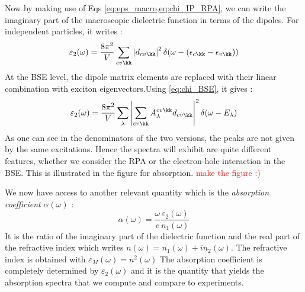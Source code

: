 Now by making use of Eqs \eqref{eq:eps_macro,eq:chi_IP_RPA}, we can write the imaginary part of the macroscopic dielectric function in terms of the dipoles. For independent particles, it writes :
\begin{equation}
	\varepsilon_2(\omega) = \frac{8\pi^2}{V} \sum_{cv\kk} \left| d_{cv\kk} \right|^2 \delta(\omega - (\epsilon_{c\kk} - \epsilon_{v\kk}) ) \label{eq:eps_2_IP}
\end{equation}
At the \gls{BSE} level, the dipole matrix elements are replaced with their linear combination with exciton eigenvectors.Using \eqref{eq:chi_BSE}, it gives :
\begin{equation}
	\varepsilon_2(\omega) = \frac{8\pi^2}{V} \sum_\lambda \left| \sum_{cv\kk} A_\lambda^{cv\kk} d_{cv\kk} \right|^2 \delta(\omega - E_\lambda) \label{eq:eps_2_exc}
\end{equation}
As one can see in the denominators of the two versions, the peaks are not given by the same excitations. Hence the spectra will exhibit are quite different features, whether we consider the RPA or the electron-hole interaction in the BSE. This is illustrated in the figure for absorption. \textcolor{red}{make the figure :)}

We now have access to another relevant quantity which is the \textit{absorption coefficient} $\alpha(\omega)$ :
\begin{equation}
	\alpha(\omega) = \frac{\omega}{c} \frac{\varepsilon_2(\omega)}{n_1(\omega)} \label{eq:abs_coeff}
\end{equation}
It is the ratio of the imaginary part of the dielectric function and the real part of the refractive index which writes $n(\omega) = n_1(\omega) + i n_2(\omega)$. The refractive index is obtained with $\varepsilon_M(\omega) = n^2(\omega)$
The absorption coefficient is completely determined by $\varepsilon_2(\omega)$ and it is the quantity that yields the absorption spectra that we compute and compare to experiments.

